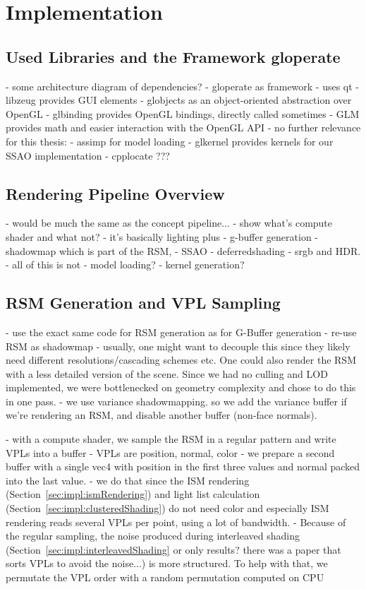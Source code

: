 

\chapter{Implementation}

\section{Used Libraries and the Framework gloperate}


- some architecture diagram of dependencies?
- gloperate as framework
    - uses qt
- libzeug provides GUI elements
- globjects as an object-oriented abstraction over OpenGL
- glbinding provides OpenGL bindings, directly called sometimes
- GLM provides math and easier interaction with the OpenGL API
- no further relevance for this thesis:
    - assimp for model loading
    - glkernel provides kernels for our SSAO implementation
    - cpplocate ???

\section{Rendering Pipeline Overview}
- would be much the same as the concept pipeline...
- show what's compute shader and what not?
- it's basically lighting plus
    - g-buffer generation
    - shadowmap which is part of the RSM,
    - SSAO
    - deferredshading
    - srgb and HDR.
    - all of this is not
- model loading?
- kernel generation?


\section{RSM Generation and VPL Sampling}
\label{sec:impl:rsmAndVplSampling}
- use the exact same code for RSM generation as for G-Buffer generation
- re-use RSM as shadowmap
    - usually, one might want to decouple this since they likely need different resolutions/cascading schemes etc. One could also render the RSM with a less detailed version of the scene. Since we had no culling and LOD implemented, we were bottlenecked on geometry complexity and chose to do this in one pass.
    - we use variance shadowmapping. so we add the variance buffer if we're rendering an RSM, and disable another buffer (non-face normals).

- with a compute shader, we sample the RSM in a regular pattern and write VPLs into a buffer
- VPLs are position, normal, color
- we prepare a second buffer with a single vec4 with position in the first three values and normal packed into the last value.
- we do that since the ISM rendering (Section~\ref{sec:impl:ismRendering}) and light list calculation (Section~\ref{sec:impl:clusteredShading}) do not need color and especially ISM rendering reads several VPLs per point, using a lot of bandwidth.
- Because of the regular sampling, the noise produced during interleaved shading (Section~\ref{sec:impl:interleavedShading} or only results? there was a paper that sorts VPLs to avoid the noise...) is more structured. To help with that, we permutate the VPL order with a random permutation computed on CPU

